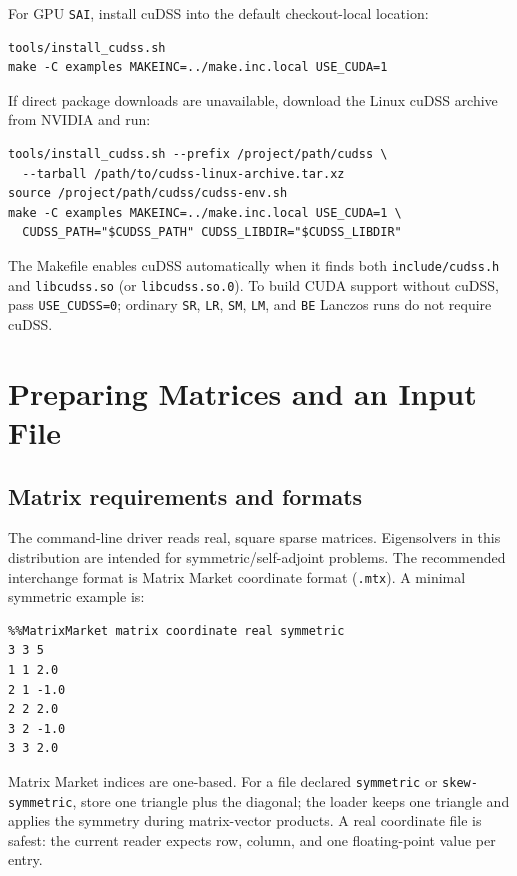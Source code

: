 \documentclass[11pt]{article}
\newcommand{\code}[1]{\texttt{#1}}
\begin{document}
For GPU \code{SAI}, install cuDSS into the default checkout-local location:

\begin{lstlisting}
tools/install_cudss.sh
make -C examples MAKEINC=../make.inc.local USE_CUDA=1
\end{lstlisting}

If direct package downloads are unavailable, download the Linux cuDSS archive
from NVIDIA and run:

\begin{lstlisting}
tools/install_cudss.sh --prefix /project/path/cudss \
  --tarball /path/to/cudss-linux-archive.tar.xz
source /project/path/cudss/cudss-env.sh
make -C examples MAKEINC=../make.inc.local USE_CUDA=1 \
  CUDSS_PATH="$CUDSS_PATH" CUDSS_LIBDIR="$CUDSS_LIBDIR"
\end{lstlisting}

The Makefile enables cuDSS automatically when it finds both
\code{include/cudss.h} and \code{libcudss.so} (or
\code{libcudss.so.0}).  To build CUDA support without cuDSS, pass
\code{USE\_CUDSS=0}; ordinary \code{SR}, \code{LR}, \code{SM}, \code{LM}, and
\code{BE} Lanczos runs do not require cuDSS.

\section{Preparing Matrices and an Input File}

\subsection{Matrix requirements and formats}

The command-line driver reads real, square sparse matrices.  Eigensolvers in
this distribution are intended for symmetric/self-adjoint problems.  The
recommended interchange format is Matrix Market coordinate format
(\code{.mtx}).  A minimal symmetric example is:

\begin{lstlisting}
%%MatrixMarket matrix coordinate real symmetric
3 3 5
1 1 2.0
2 1 -1.0
2 2 2.0
3 2 -1.0
3 3 2.0
\end{lstlisting}

Matrix Market indices are one-based.  For a file declared \code{symmetric} or
\code{skew-symmetric}, store one triangle plus the diagonal; the loader keeps
one triangle and applies the symmetry during matrix-vector products.  A real
coordinate file is safest: the current reader expects row, column, and one
floating-point value per entry.
\end{document}
